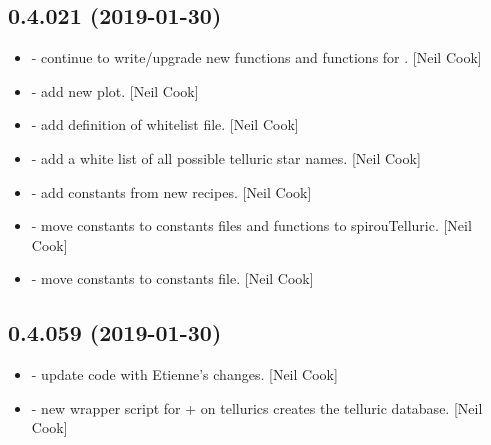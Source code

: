 \documentclass[a4paper,10pt,english]{report}
\begin{document}
\subsection{0.4.021 (2019-01-30)}
\label{\detokenize{misc/changelog:id202}}\begin{itemize}
\item {} 
 - continue to write/upgrade new  functions
and functions for . {[}Neil Cook{]}

\item {} 
 - add new  plot. {[}Neil Cook{]}

\item {} 
 - add definition of whitelist file. {[}Neil Cook{]}

\item {} 
 - add a white list of all possible telluric star
names. {[}Neil Cook{]}

\item {} 
 - add constants from new recipes. {[}Neil Cook{]}

\item {} 
 - move constants to constants files and functions
to spirouTelluric. {[}Neil Cook{]}

\item {} 
 - move constants to constants file. {[}Neil Cook{]}

\end{itemize}


\subsection{0.4.059 (2019-01-30)}
\label{\detokenize{misc/changelog:id203}}\begin{itemize}
\item {} 
 - update code with Etienne’s changes. {[}Neil Cook{]}

\item {} 
 - new wrapper script for  +  on
tellurics \textendash{} creates the telluric database. {[}Neil Cook{]}

\end{itemize}
\end{document}

